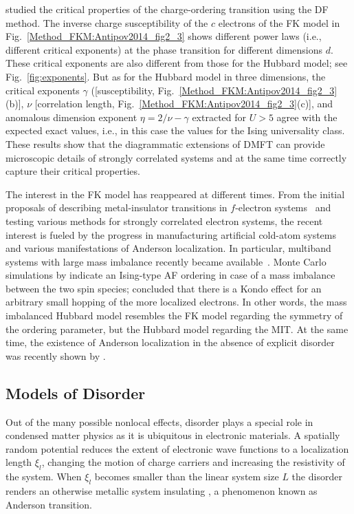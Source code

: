 \documentclass[rmp,aps,reprint,amsmath,amssymb,superscriptaddress,showpacs,nofootinbib]{revtex4-1}
\begin{document}
 studied the critical properties of the charge-ordering transition using the DF method. The inverse charge susceptibility of the $c$ electrons of the  FK model in Fig.~\ref{Method_FKM:Antipov2014_fig2_3} shows different power laws (i.e., different critical exponents) at the phase transition for different dimensions $d$.  These critical exponents are also different from those for the Hubbard model; see Fig.~\ref{fig:exponents}. But as for the Hubbard model in three dimensions,  the critical exponents $\gamma$ ([susceptibility, Fig.~\ref{Method_FKM:Antipov2014_fig2_3}(b)], $\nu$ [correlation length, Fig.~\ref{Method_FKM:Antipov2014_fig2_3}(c)], and anomalous dimension exponent $\eta = 2/\nu - \gamma$ extracted for $U > 5$ agree with the expected exact values, i.e., in this case the values for the Ising universality class. These results show that the diagrammatic extensions of DMFT can provide microscopic details of strongly correlated systems and at the same time correctly capture their critical properties. 

The interest in the FK model has reappeared at different times. From the initial proposals of describing metal-insulator transitions in $f$-electron systems~\cite{Falicov1969, Ramirez1970} and testing various methods for  strongly correlated electron systems, the recent interest is fueled by the progress in manufacturing artificial cold-atom systems and various manifestations of Anderson localization. In particular, multiband systems with large mass imbalance recently became available~\cite{Jotzu2015,Greif2015}. Monte Carlo simulations by  indicate an Ising-type AF ordering in case of a mass imbalance between the two spin species;  concluded that there is a Kondo effect for an arbitrary small hopping of the more localized electrons. In other words, the mass imbalanced Hubbard model resembles the FK model regarding the symmetry of the ordering parameter, but the Hubbard model regarding the MIT. At the same time, the existence of Anderson localization in the absence of explicit disorder was recently shown by .

\subsection{Models of Disorder}
\label{sec:disorder}

Out of the many possible nonlocal effects, disorder plays a special role in condensed matter physics as it is ubiquitous in electronic materials. A spatially random potential reduces the extent of electronic wave functions to a localization length $\xi_l$, changing the motion of charge carriers and increasing the resistivity of the system. When $\xi_l$ becomes smaller than the linear system size $L$ the disorder renders an otherwise metallic system insulating \cite{Anderson1958,Thouless1974}, a phenomenon known as Anderson transition. 
\end{document}
